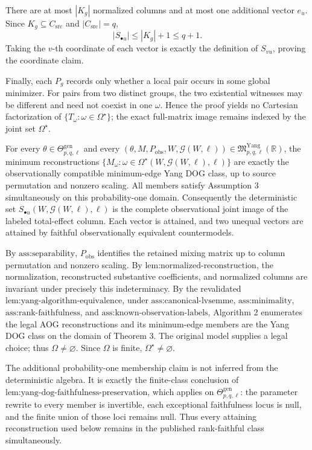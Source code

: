 There are at most \(|K_g|\) normalized columns and at most one additional vector \(e_u\).  Since \(K_g\subseteq C_{\mathrm{src}}\) and \(|C_{\mathrm{src}}|=q\),
\[
|S_{\bullet u}|\le |K_g|+1\le q+1.
\]
Taking the \(v\)-th coordinate of each vector is exactly the definition of \(S_{vu}\), proving the coordinate claim.

Finally, each \(P_g\) records only whether a local pair occurs in some global minimizer.  For pairs from two distinct groups, the two existential witnesses may be different and need not coexist in one \(\omega\).  Hence the proof yields no Cartesian factorization of \(\{T_\omega:\omega\in\Omega^\star\}\); the exact full-matrix image remains indexed by the joint set \(\Omega^\star\).

For every \(\theta\in\Theta_{p,q,\ell}^{\mathrm{gen}}\) and every \((\theta,M,P_{\mathrm{obs}},W,\mathcal G(W,\ell))\in\mathfrak M_{p,q,\ell}^{\mathrm{Yang}}(\mathbb R)\), the minimum reconstructions \(\{M_\omega:\omega\in\Omega^\star(W,\mathcal G(W,\ell),\ell)\}\) are exactly the observationally compatible minimum-edge Yang DOG class, up to source permutation and nonzero scaling.  All members satisfy Assumption 3 simultaneously on this probability-one domain.  Consequently the deterministic set \(S_{\bullet u}(W,\mathcal G(W,\ell),\ell)\) is the complete observational joint image of the labeled total-effect column.  Each vector is attained, and two unequal vectors are attained by faithful observationally equivalent countermodels.

By \(\text{ass:separability}\), \(P_{\mathrm{obs}}\) identifies the retained mixing matrix up to column permutation and nonzero scaling.  By \(\text{lem:normalized-reconstruction}\), the normalization, reconstructed substantive coefficients, and normalized columns are invariant under precisely this indeterminacy.  By the revalidated \(\text{lem:yang-algorithm-equivalence}\), under \(\text{ass:canonical-lvsemme}\), \(\text{ass:minimality}\), \(\text{ass:rank-faithfulness}\), and \(\text{ass:known-observation-labels}\), Algorithm 2 enumerates the legal AOG reconstructions and its minimum-edge members are the Yang DOG class on the domain of Theorem 3.  The original model supplies a legal choice; thus \(\Omega\ne\varnothing\).  Since \(\Omega\) is finite, \(\Omega^\star\ne\varnothing\).

The additional probability-one membership claim is not inferred from the deterministic algebra.  It is exactly the finite-class conclusion of \(\text{lem:yang-dog-faithfulness-preservation}\), which applies on \(\Theta_{p,q,\ell}^{\mathrm{gen}}\): the parameter rewrite to every member is invertible, each exceptional faithfulness locus is null, and the finite union of those loci remains null.  Thus every attaining reconstruction used below remains in the published rank-faithful class simultaneously.

